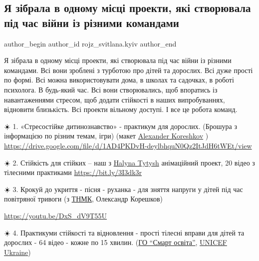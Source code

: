  
 
 
 
 

\subsection{Я зібрала в одному місці проекти, які створювала під час війни із різними командами}
\label{sec:08_02_2023.fb.rojz_svitlana.kyiv.1.ya_z_brala_v_odnomu_}

\ifcmt
 author_begin
   author_id rojz_svitlana.kyiv
 author_end
\fi

Я зібрала в одному місці проекти, які створювала під час війни із різними
командами. Всі вони зроблені з турботою про дітей та дорослих. Всі дуже прості
по формі. Всі можна використовувати дома, в школах та садочках, в роботі
психолога. В будь-який час. Всі вони створювались, щоб впоратись із
навантаженнями стресом, щоб додати стійкості в наших випробуваннях, відновити
близькість. Всі проекти вільному доступі. І все це робота команд. 

☀️ 1. «Стресостійке дитинознавство» - практикум для дорослих. (Брошура з
інформацією по різним темам, ігри) (макет \href{https://www.facebook.com/alexander.koreshkov.7}{Alexander Koreshkov} )
\url{https://drive.google.com/file/d/1AD4PKDvH-deylbhquN0Qz2ItJdH6tWEt/view}

☀️ 2. Стійкість для стійких – наш з \href{https://www.facebook.com/htytysh}{Halyna Tytysh} анімаційний проект, 20 відео з
тілесними практиками \url{https://bit.ly/3I3dk3r}

☀️ 3. Крокуй до укриття - пісня - руханка - для зняття напруги у дітей під час
повітряної тривоги (з \href{https://www.facebook.com/TNMKband}{ТНМК}, Олександр Корешков)

\url{https://youtu.be/DxS_dV9T55U}

☀️ 4. Практикуми стійкості та відновлення - прості тілесні вправи для дітей та
дорослих  - 64 відео - кожне по 15 хвилин. (\href{https://www.facebook.com/smartosvita}{ГО \enquote{Смарт освіта}}, 
\href{https://www.facebook.com/UNICEFUkraine}{UNICEF Ukraine})

